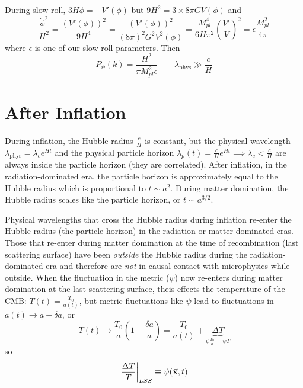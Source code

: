 \documentclass[a4paper,twoside,master.tex]{subfiles}
\begin{document}
During slow roll, $ 3H \dot{\phi} = - V'(\phi) $ but $ 9 H^2 = 3 \times 8 \pi G V(\phi) $ and
\begin{equation}
    \frac{\dot{\phi}^2}{H^2} = \frac{(V'(\phi))^2}{9 H^4} = \frac{(V'(\phi))^2}{(8 \pi)^2 G^2 V^2(\phi)} = \frac{M_{pl}^4}{6 H \pi^2} \left( \frac{V'}{V} \right)^2 = \epsilon \frac{M_{pl}^2}{4 \pi}
\end{equation}
where $ \epsilon $ is one of our slow roll parameters. Then
\begin{equation}
    P_{\psi}(k) = \frac{H^2}{\pi M_{pl}^2 \epsilon} \qquad \lambda_{\text{phys}} \gg \frac{c}{H}
\end{equation}

\section{After Inflation}\label{sec:after_inflation}

During inflation, the Hubble radius $ \frac{c}{H} $ is constant, but the physical wavelength $ \lambda_{\text{phys}} = \lambda_c e^{Ht} $ and the physical particle horizon $ \lambda_p(t) = \frac{c}{H} e^{Ht} \implies \lambda_c < \frac{c}{H} $ are always inside the particle horizon (they are correlated). After inflation, in the radiation-dominated era, the particle horizon is approximately equal to the Hubble radius which is proportional to $ t \sim a^2 $. During matter domination, the Hubble radius scales like the particle horizon, or $ t \sim a^{3/2} $.

Physical wavelengths that cross the Hubble radius during inflation re-enter the Hubble radius (the particle horizon) in the radiation or matter dominated eras. Those that re-enter during matter domination at the time of recombination (last scattering surface) have been \textit{outside} the Hubble radius during the radiation-dominated era and therefore are \textit{not} in causal contact with microphysics while outside. When the fluctuation in the metric ($ \psi $) now re-enters during matter domination at the last scattering surface, theis effects the temperature of the CMB: $ T(t) = \frac{T_0}{a(t)} $, but metric fluctuations like $ \psi $ lead to fluctuations in $ a(t) \to a + \delta a $, or
\begin{equation}
    T(t) \to \frac{T_0}{a} \left( 1 - \frac{\delta a}{a} \right) = \frac{T_0}{a(t)} + \underbrace{\Delta T}_{\psi \frac{T_0}{a} = \psi T}
\end{equation}
so
\begin{equation}
    \eval{\frac{\Delta T}{T}}_{LSS} \equiv \psi(\va{x}, t)
\end{equation}
\end{document}

